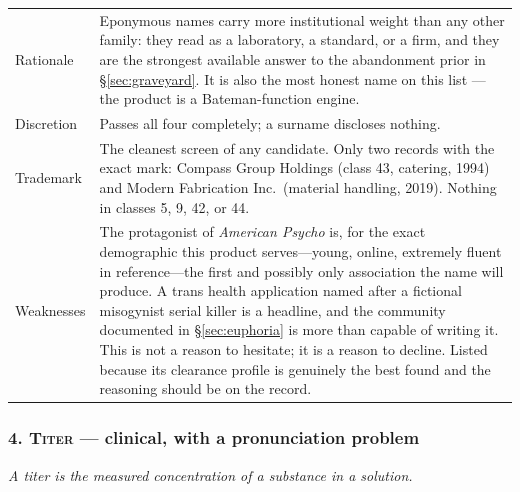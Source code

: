 \documentclass[11pt,a4paper]{article}
\newcommand{\bad}[1]{\obs{#1}}
\newcommand{\good}[1]{#1}
\newcommand{\name}[1]{\textsc{#1}}
\begin{document}
\begin{longtable}{@{}L{3.0cm}L{12.1cm}@{}}
\toprule
\endhead
Rationale &
Eponymous names carry more institutional weight than any other family:
they read as a laboratory, a standard, or a firm, and they are the
strongest available answer to the abandonment prior in
\S\ref{sec:graveyard}. It is also the most honest name on this list ---
the product is a Bateman-function engine. \\[0.35em]
Discretion & \good{Passes all four} completely; a surname discloses
nothing. \\[0.35em]
Trademark & \good{The cleanest screen of any candidate.} Only two
records with the exact mark: Compass Group Holdings (class 43,
catering, 1994) and Modern Fabrication Inc.\ (material handling, 2019).
\good{Nothing in classes 5, 9, 42, or 44.} \\[0.35em]
Weaknesses & \bad{Patrick Bateman.} The protagonist of \emph{American
Psycho} is, for the exact demographic this product serves---young,
online, extremely fluent in reference---the first and possibly only
association the name will produce. A trans health application named
after a fictional misogynist serial killer is a headline, and the
community documented in \S\ref{sec:euphoria} is more than capable of
writing it. This is not a reason to hesitate; it is a reason to
decline. Listed because its clearance profile is genuinely the best
found and the reasoning should be on the record. \\
\bottomrule
\end{longtable}

\subsubsection*{4. \name{Titer} --- clinical, with a pronunciation problem}

\emph{A titer is the measured concentration of a substance in a
solution.}
\end{document}
